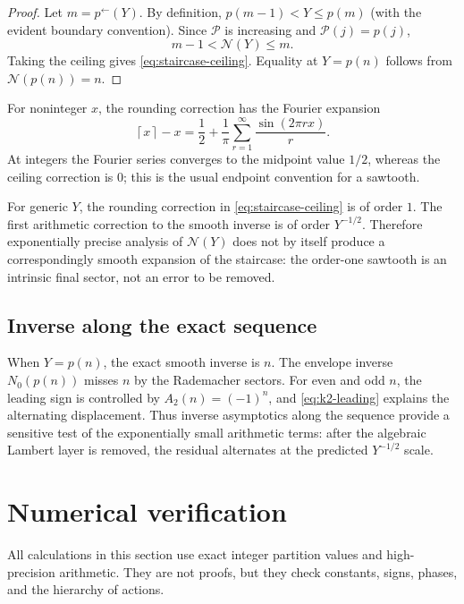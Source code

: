 \documentclass[11pt]{article}
\numberwithin{equation}{section}
\theoremstyle{mainthm}
\theoremstyle{defstyle}
\theoremstyle{remark}
\newcommand{\ceil}[1]{\left\lceil#1\right\rceil}
\newcommand{\Pcal}{\mathcal P}
\newcommand{\Ncal}{\mathcal N}
\begin{document}
\begin{proof}
Let \(m=p^{\leftarrow}(Y)\).  By definition,
\(
 p(m-1)<Y\le p(m)
\)
(with the evident boundary convention).  Since \(\Pcal\) is increasing and \(\Pcal(j)=p(j)\),
\[
 m-1<\Ncal(Y)\le m.
\]
Taking the ceiling gives \eqref{eq:staircase-ceiling}.  Equality at \(Y=p(n)\) follows from \(\Ncal(p(n))=n\).
\end{proof}

For noninteger \(x\), the rounding correction has the Fourier expansion
\begin{equation}\label{eq:ceiling-Fourier}
 \ceil{x}-x=\frac12+\frac1\pi\sum_{r=1}^{\infty}\frac{\sin(2\pi r x)}r.
\end{equation}
At integers the Fourier series converges to the midpoint value \(1/2\), whereas the ceiling correction is \(0\); this is the usual endpoint convention for a sawtooth.

\begin{warningbox}
For generic \(Y\), the rounding correction in \eqref{eq:staircase-ceiling} is of order \(1\).  The first arithmetic correction to the smooth inverse is of order \(Y^{-1/2}\).  Therefore exponentially precise analysis of \(\Ncal(Y)\) does not by itself produce a correspondingly smooth expansion of the staircase: the order-one sawtooth is an intrinsic final sector, not an error to be removed.
\end{warningbox}

\subsection{Inverse along the exact sequence}

When \(Y=p(n)\), the exact smooth inverse is \(n\).  The envelope inverse \(N_0(p(n))\) misses \(n\) by the Rademacher sectors.  For even and odd \(n\), the leading sign is controlled by \(A_2(n)=(-1)^n\), and \eqref{eq:k2-leading} explains the alternating displacement.  Thus inverse asymptotics along the sequence provide a sensitive test of the exponentially small arithmetic terms: after the algebraic Lambert layer is removed, the residual alternates at the predicted \(Y^{-1/2}\) scale.

\section{Numerical verification}\label{sec:numerics}

All calculations in this section use exact integer partition values and high-precision arithmetic.  They are not proofs, but they check constants, signs, phases, and the hierarchy of actions.
\end{document}
